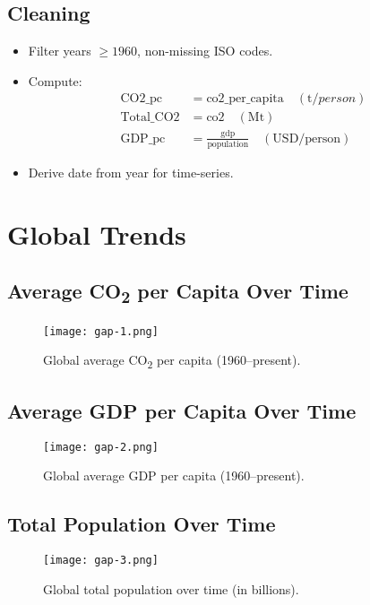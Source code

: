 \documentclass[11pt,a4paper]{article}
\begin{document}
\subsection{Cleaning}
\begin{itemize}
  \item Filter years \(\ge1960\), non-missing ISO codes.
  \item Compute:
    \begin{align*}
      \text{CO2\_pc} &= \text{co2\_per\_capita} \quad (\si{\tonne/person})\\
      \text{Total\_CO2} &= \text{co2} \quad (\text{Mt})\\
      \text{GDP\_pc} &= \frac{\text{gdp}}{\text{population}} \quad (\text{USD/person})
    \end{align*}
  \item Derive date from year for time-series.
\end{itemize}

\section{Global Trends}
\subsection{Average CO\textsubscript{2} per Capita Over Time}
\begin{figure}[H]
  \centering
  \texttt{[image: gap-1.png]}
  \caption{Global average CO\textsubscript{2} per capita (1960--present).}
  \label{fig:avg-co2-pc}
\end{figure}

\subsection{Average GDP per Capita Over Time}
\begin{figure}[H]
  \centering
  \texttt{[image: gap-2.png]}
  \caption{Global average GDP per capita (1960--present).}
  \label{fig:avg-gdp-pc}
\end{figure}

\subsection{Total Population Over Time}
\begin{figure}[H]
  \centering
  \texttt{[image: gap-3.png]}
  \caption{Global total population over time (in billions).}
  \label{fig:total-pop}
\end{figure}
\end{document}
